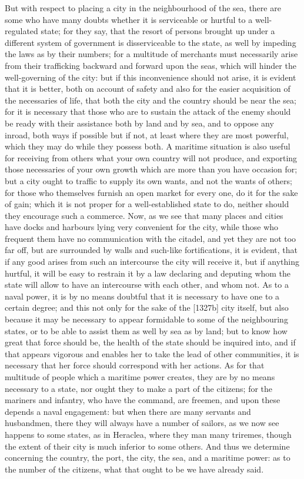 But with respect to placing a city in the neighbourhood of the sea, there
are some who have many doubts whether it is serviceable or hurtful to a
well-regulated state; for they say, that the resort of persons brought up
under a different system of government is disserviceable to the state, as
well by impeding the laws as by their numbers; for a multitude of
merchants must necessarily arise from their trafficking backward and
forward upon the seas, which will hinder the well-governing of the city:
but if this inconvenience should not arise, it is evident that it is
better, both on account of safety and also for the easier acquisition of
the necessaries of life, that both the city and the country should be near
the sea; for it is necessary that those who are to sustain the attack of
the enemy should be ready with their assistance both by land and by sea,
and to oppose any inroad, both ways if possible but if not, at least where
they are most powerful, which they may do while they possess both. A
maritime situation is also useful for receiving from others what your own
country will not produce, and exporting those necessaries of your own
growth which are more than you have occasion for; but a city ought to
traffic to supply its own wants, and not the wants of others; for those
who themselves furnish an open market for every one, do it for the sake of
gain; which it is not proper for a well-established state to do, neither
should they encourage such a commerce. Now, as we see that many places and
cities have docks and harbours lying very convenient for the city, while
those who frequent them have no communication with the citadel, and yet
they are not too far off, but are surrounded by walls and such-like
fortifications, it is evident, that if any good arises from such an
intercourse the city will receive it, but if anything hurtful, it will be
easy to restrain it by a law declaring and deputing whom the state will
allow to have an intercourse with each other, and whom not. As to a naval
power, it is by no means doubtful that it is necessary to have one to a
certain degree; and this not only for the sake of the [1327b] city itself,
but also because it may be necessary to appear formidable to some of the
neighbouring states, or to be able to assist them as well by sea as by
land; but to know how great that force should be, the health of the state
should be inquired into, and if that appears vigorous and enables her to
take the lead of other communities, it is necessary that her force should
correspond with her actions. As for that multitude of people which a
maritime power creates, they are by no means necessary to a state, nor
ought they to make a part of the citizens; for the mariners and infantry,
who have the command, are freemen, and upon these depends a naval
engagement: but when there are many servants and husbandmen, there they
will always have a number of sailors, as we now see happens to some
states, as in Heraclea, where they man many triremes, though the extent of
their city is much inferior to some others. And thus we determine
concerning the country, the port, the city, the sea, and a maritime power:
as to the number of the citizens, what that ought to be we have already
said.


